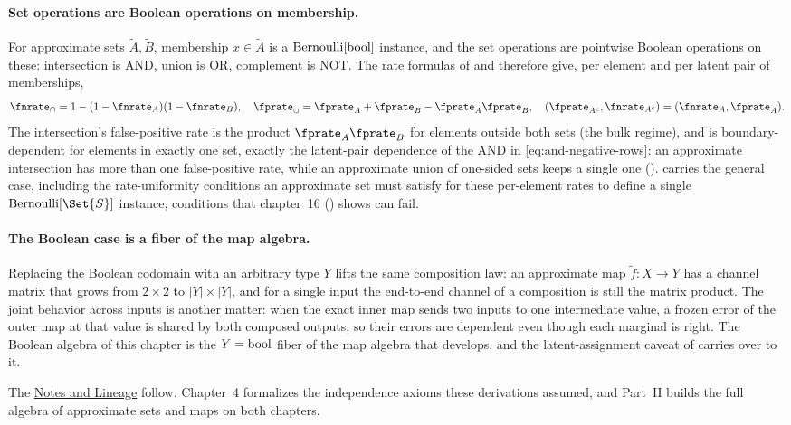 \paragraph{Set operations are Boolean operations on membership.}
For approximate sets $\tilde{A}, \tilde{B}$, membership $x \in \tilde{A}$ is a
$\mathrm{Bernoulli}[\mathrm{bool}]$ instance, and the set operations are pointwise Boolean
operations on these: intersection is AND, union is OR, complement is NOT. The
rate formulas of  and  therefore
give, per element and per latent pair of memberships,
\[
  \fnrate_\cap = 1 - (1 - \fnrate_A)(1 - \fnrate_B),
  \quad
  \fprate_\cup = \fprate_A + \fprate_B - \fprate_A \fprate_B,
  \quad
  (\fprate_{A^c}, \fnrate_{A^c}) = (\fnrate_A, \fprate_A).
\]
The intersection's false-positive rate is the product $\fprate_A \fprate_B$ for
elements outside both sets (the bulk regime), and is boundary-dependent for
elements in exactly one set, exactly the latent-pair dependence of the AND in
\eqref{eq:and-negative-rows}: an approximate intersection has more than one
false-positive rate, while an approximate union of one-sided sets keeps a single
one ().  carries the general case,
including the rate-uniformity conditions an approximate set must satisfy for
these per-element rates to define a single $\Bernoulli{\Set{S}}$ instance,
conditions that chapter~16 () shows can fail.

\paragraph{The Boolean case is a fiber of the map algebra.}
Replacing the Boolean codomain with an arbitrary type $Y$ lifts the same
composition law: an approximate map $\tilde{f} : X \to Y$ has a channel matrix
that grows from $2 \times 2$ to $|Y| \times |Y|$, and for a single input the
end-to-end channel of a composition is still the matrix product. The joint
behavior across inputs is another matter: when the exact inner map sends two
inputs to one intermediate value, a frozen error of the outer map at that value
is shared by both composed outputs, so their errors are dependent even though
each marginal is right. The Boolean algebra of this chapter is the $Y =
\mathrm{bool}$ fiber of the map algebra that 
develops, and the latent-assignment caveat of 
carries over to it.

The \hyperref[sec:bib-notes-ch3]{Notes and Lineage} follow. Chapter~4
formalizes the independence axioms these derivations assumed, and Part~II
builds the full algebra of approximate sets and maps on both chapters.
